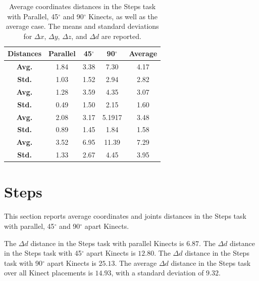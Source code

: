 \begin{table}[!h]
\centering
  
  \begin{tabulary}{1.0\linewidth}{||c c c c c||} 
   \hline
   \textbf{Distances} & \textbf{Parallel} & \textbf{45$^{\circ}$} & \textbf{90$^{\circ}$} & \textbf{Average} \\ [0.5ex] 
   \hline\hline
   \textbf{Avg.}  & 1.84 & 3.38 & 7.30 & 4.17 \\
   \hline
   \textbf{Std.}  & 1.03 & 1.52 & 2.94 & 2.82 \\
   \hline
   \textbf{Avg.}  & 1.28 & 3.59 & 4.35 & 3.07 \\
   \hline
   \textbf{Std.}  & 0.49 & 1.50 & 2.15 & 1.60 \\
   \hline
   \textbf{Avg.}  & 2.08 & 3.17 & 5.1917 & 3.48 \\
   \hline
   \textbf{Std.}  & 0.89 & 1.45 & 1.84 & 1.58 \\
   \hline
   \textbf{Avg.}  & 3.52 & 6.95 & 11.39 & 7.29 \\
   \hline
   \textbf{Std.}  & 1.33 & 2.67 & 4.45 & 3.95 \\
   \hline
  \end{tabulary}
  
  \caption{Average coordinates distances in the Steps task with Parallel, 45$^{\circ}$ and 90$^{\circ}$ Kinects, as well as the average case. The means and standard deviations for $\Delta x$, $\Delta y$, $\Delta z$, and $\Delta d$ are reported.}
  
  \label{table:stationary_coordinates_values}
\end{table}

\section{Steps}
\label{sec:results_steps}

This section reports average coordinates and joints distances in the Steps task with parallel, 45$^{\circ}$ and 90$^{\circ}$ apart Kinects.

The $\Delta d$ distance in the Steps task with parallel Kinects is $6.87$. The $\Delta d$ distance in the Steps task with 45$^{\circ}$ apart Kinects is $12.80$. The $\Delta d$ distance in the Steps task with 90$^{\circ}$ apart Kinects is $25.13$. The average $\Delta d$ distance in the Steps task over all Kinect placements is $14.93$, with a standard deviation of $9.32$.

